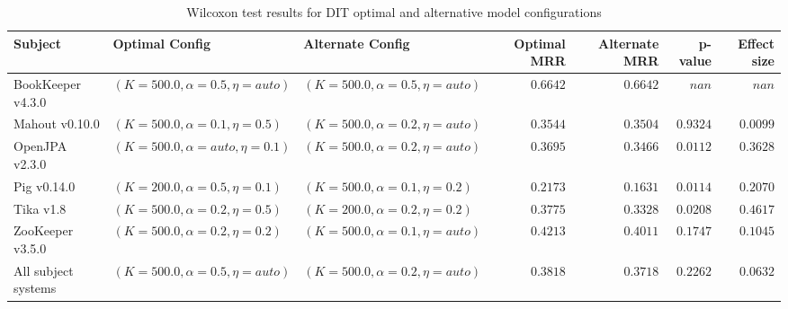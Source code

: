 \begin{landscape}
\begin{table}
\begin{spacing}{1.2}
\centering
\caption{Wilcoxon test results for DIT optimal and alternative model configurations}
\label{table:combo-dit-model-sweep-wilcox}
\begin{tabular}{lllrrrr}
\toprule
                      Subject &                      Optimal Config &                    Alternate Config & Optimal MRR & Alternate MRR &  p-value & Effect size \\
\midrule
            BookKeeper v4.3.0 &  $(K=500.0, \alpha=0.5, \eta=auto)$ &  $(K=500.0, \alpha=0.5, \eta=auto)$ &    $0.6642$ &      $0.6642$ &    $nan$ &       $nan$ \\
               Mahout v0.10.0 &   $(K=500.0, \alpha=0.1, \eta=0.5)$ &  $(K=500.0, \alpha=0.2, \eta=auto)$ &    $0.3544$ &      $0.3504$ & $0.9324$ &    $0.0099$ \\
               OpenJPA v2.3.0 &  $(K=500.0, \alpha=auto, \eta=0.1)$ &  $(K=500.0, \alpha=0.2, \eta=auto)$ &    $0.3695$ &      $0.3466$ & $0.0112$ &    $0.3628$ \\
                  Pig v0.14.0 &   $(K=200.0, \alpha=0.5, \eta=0.1)$ &   $(K=500.0, \alpha=0.1, \eta=0.2)$ &    $0.2173$ &      $0.1631$ & $0.0114$ &    $0.2070$ \\
                    Tika v1.8 &   $(K=500.0, \alpha=0.2, \eta=0.5)$ &   $(K=200.0, \alpha=0.2, \eta=0.2)$ &    $0.3775$ &      $0.3328$ & $0.0208$ &    $0.4617$ \\
             ZooKeeper v3.5.0 &   $(K=500.0, \alpha=0.2, \eta=0.2)$ &  $(K=500.0, \alpha=0.1, \eta=auto)$ &    $0.4213$ &      $0.4011$ & $0.1747$ &    $0.1045$ \\
 \midrule
All subject systems &  $(K=500.0, \alpha=0.5, \eta=auto)$ &  $(K=500.0, \alpha=0.2, \eta=auto)$ &    $0.3818$ &      $0.3718$ & $0.2262$ &    $0.0632$ \\
\bottomrule
\end{tabular}

\end{spacing}
\end{table}

\end{landscape}
